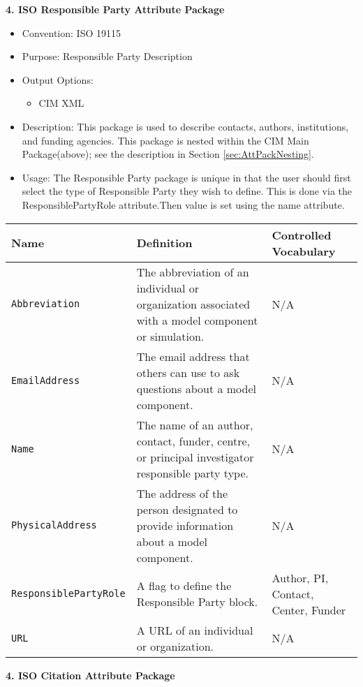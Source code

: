 \vspace{.20in}
{\bf 4. ISO Responsible Party Attribute Package}

\begin{itemize}
    \item Convention: ISO 19115
    \item Purpose: Responsible Party Description
    \item Output Options: 
    \begin{itemize}
        \item CIM XML 
    \end{itemize} 
    \item Description: This package is used to describe contacts, authors, institutions, and funding agencies. This package is nested within the CIM Main Package(above); see the description in Section \ref{sec:AttPackNesting}.
    \item Usage: The Responsible Party package is unique in that the user should first select the type of Responsible Party they wish to define. This is done via the ResponsiblePartyRole attribute.Then value is set using the name attribute.  
\end{itemize}


\begin{tabular}{|p{6cm}|p{10cm}|p{10cm}|}
     {\bf Name } & {\bf Definition} & {\bf Controlled Vocabulary} \\
     \hline\hline
     {\tt Abbreviation} & The abbreviation of an individual or organization associated with a model component or simulation. & N/A \\
     {\tt EmailAddress} & The email address that others can use to ask questions about a model component. & N/A \\
     {\tt Name} & The name of an author, contact, funder, centre, or principal investigator responsible party type. & N/A \\
     {\tt PhysicalAddress} & The address of the person designated to provide information about a model component. & N/A \\
     {\tt ResponsiblePartyRole} & A flag to define the Responsible Party block. & Author, PI, Contact, Center, Funder\\
     {\tt URL} & A URL of an individual or organization. & N/A \\
\end{tabular}


\vspace{.20in}
{\bf 4. ISO Citation Attribute Package}

